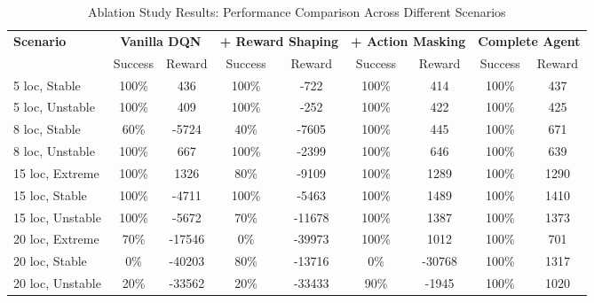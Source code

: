 
\begin{table}[h]
\centering
\caption{Ablation Study Results: Performance Comparison Across Different Scenarios}
\label{tab:ablation_results}
\begin{tabular}{|l|cc|cc|cc|cc|}
\hline
\multirow{2}{*}{\textbf{Scenario}} & \multicolumn{2}{c|}{\textbf{Vanilla DQN}} & \multicolumn{2}{c|}{\textbf{+ Reward Shaping}} & \multicolumn{2}{c|}{\textbf{+ Action Masking}} & \multicolumn{2}{c|}{\textbf{Complete Agent}} \\
& Success & Reward & Success & Reward & Success & Reward & Success & Reward \\
\hline
5 loc, Stable & 100\% & 436 & 100\% & -722 & 100\% & 414 & 100\% & 437 \\
5 loc, Unstable & 100\% & 409 & 100\% & -252 & 100\% & 422 & 100\% & 425 \\
8 loc, Stable & 60\% & -5724 & 40\% & -7605 & 100\% & 445 & 100\% & 671 \\
8 loc, Unstable & 100\% & 667 & 100\% & -2399 & 100\% & 646 & 100\% & 639 \\
15 loc, Extreme & 100\% & 1326 & 80\% & -9109 & 100\% & 1289 & 100\% & 1290 \\
15 loc, Stable & 100\% & -4711 & 100\% & -5463 & 100\% & 1489 & 100\% & 1410 \\
15 loc, Unstable & 100\% & -5672 & 70\% & -11678 & 100\% & 1387 & 100\% & 1373 \\
20 loc, Extreme & 70\% & -17546 & 0\% & -39973 & 100\% & 1012 & 100\% & 701 \\
20 loc, Stable & 0\% & -40203 & 80\% & -13716 & 0\% & -30768 & 100\% & 1317 \\
20 loc, Unstable & 20\% & -33562 & 20\% & -33433 & 90\% & -1945 & 100\% & 1020 \\
\hline
\end{tabular}
\end{table}
